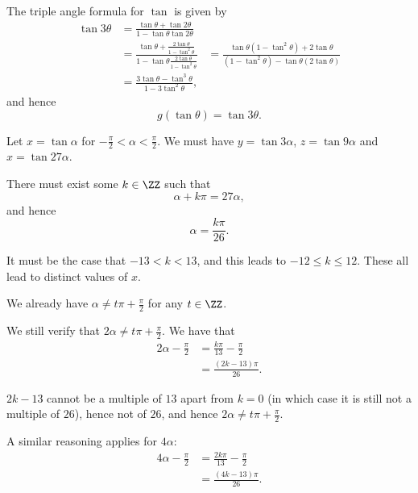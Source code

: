 \begin{enumerate}
          The triple angle formula for \(\tan\) is given by
          \begin{align*}
              \tan 3\theta & = \frac{\tan \theta + \tan 2\theta}{1 - \tan \theta \tan 2\theta}                                                       \\
                           & = \frac{\tan \theta + \frac{2 \tan \theta}{1 - \tan^2 \theta}}{1 - \tan \theta \frac{2 \tan \theta}{1 - \tan^2 \theta}}
                           & = \frac{\tan \theta (1 - \tan^2 \theta) + 2 \tan \theta}{(1 - \tan^2 \theta) - \tan \theta (2 \tan \theta)}             \\
                           & = \frac{3 \tan \theta - \tan^3 \theta}{1 - 3 \tan^2 \theta},
          \end{align*}
          and hence
          \[
              g (\tan \theta) = \tan 3 \theta.
          \]

          Let \(x = \tan \alpha\) for \(-\frac{\pi}{2} < \alpha < \frac{\pi}{2}\). We must have \(y = \tan 3\alpha\), \(z = \tan 9 \alpha\) and \(x = \tan 27 \alpha\).

          There must exist some \(k \in \ZZ\) such that
          \[
              \alpha + k \pi = 27 \alpha,
          \]
          and hence
          \[
              \alpha = \frac{k\pi}{26}.
          \]

          It must be the case that \(-13 < k < 13\), and this leads to \(-12 \leq k \leq 12\). These all lead to distinct values of \(x\).

          We already have \(\alpha \neq t\pi + \frac{\pi}{2}\) for any \(t \in \ZZ\).

          We still verify that \(2\alpha \neq t\pi + \frac{\pi}{2}\). We have that
          \begin{align*}
              2 \alpha - \frac{\pi}{2} & = \frac{k\pi}{13} - \frac{\pi}{2} \\
                                       & = \frac{(2k - 13)\pi}{26}.
          \end{align*}

          \(2k - 13\) cannot be a multiple of \(13\) apart from \(k = 0\) (in which case it is still not a multiple of \(26\)), hence not of \(26\), and hence \(2\alpha \neq t\pi + \frac{\pi}{2}\).

          A similar reasoning applies for \(4\alpha\):
          \begin{align*}
              4 \alpha - \frac{\pi}{2} & = \frac{2k\pi}{13} - \frac{\pi}{2} \\
                                       & = \frac{(4k - 13)\pi}{26}.
          \end{align*}


\end{enumerate}
